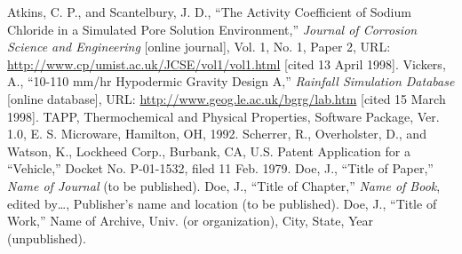 \documentclass[letterpaper]{AIAA}
\begin{document}
\begin{thebibliography}{}
 Atkins, C. P., and Scantelbury, J. D., ``The Activity Coefficient of Sodium Chloride in a Simulated Pore Solution Environment,'' \textit{Journal of Corrosion Science and Engineering} [online journal], Vol. 1, No. 1, Paper 2, URL: \url{http://www.cp/umist.ac.uk/JCSE/vol1/vol1.html} [cited 13 April 1998].
 Vickers, A., ``10-110 mm/hr Hypodermic Gravity Design A,'' \textit{Rainfall Simulation Database} [online database], URL: \url{http://www.geog.le.ac.uk/bgrg/lab.htm} [cited 15 March 1998].
 TAPP, Thermochemical and Physical Properties, Software Package, Ver. 1.0, E. S. Microware, Hamilton, OH, 1992.
 Scherrer, R., Overholster, D., and Watson, K., Lockheed Corp., Burbank, CA, U.S. Patent Application for a ``Vehicle,'' Docket No. P-01-1532, filed 11 Feb. 1979.
 Doe, J., ``Title of Paper,'' \textit{Name of Journal} (to be published).
 Doe, J., ``Title of Chapter,'' \textit{Name of Book}, edited by\ldots , Publisher's name and location (to be published).
 Doe, J., ``Title of Work,'' Name of Archive, Univ. (or organization), City, State, Year (unpublished).
\end{thebibliography}
\end{document}
